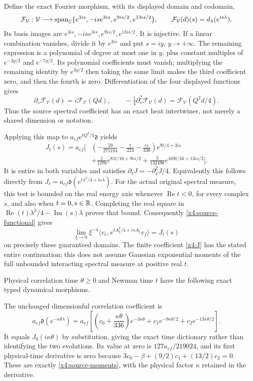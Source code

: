 Define the exact Fourier morphism, with its displayed domain and codomain,
\[
\mathcal F_{\mathcal V}:\mathcal V\longrightarrow
\operatorname{span}_{\mathbb C}\{e^{3is},-is e^{3is},e^{9is/2},e^{13is/2}\},
\qquad
\mathcal F_{\mathcal V}(d)(s)=d_\lambda(e^{is\lambda}).
\]
Its basis images are $e^{3is},-is e^{3is},e^{9is/2},e^{13is/2}$.
It is injective. If a linear combination vanishes, divide it by
$e^{3is}$ and put $s=iy$, $y\to+\infty$. The remaining expression
is a polynomial of degree at most one in $y$, plus constant multiples
of $e^{-3y/2}$ and $e^{-7y/2}$. Its polynomial coefficients must
vanish; multiplying the remaining identity by $e^{3y/2}$ then taking
the same limit makes the third coefficient zero, and then the fourth
is zero. Differentiation of the four displayed functions gives
\[
\partial_s\mathcal F_{\mathcal V}(d)
 =i\mathcal F_{\mathcal V}(Qd),\qquad
-\tfrac14\partial_s^2\mathcal F_{\mathcal V}(d)
 =\mathcal F_{\mathcal V}(Q^2d/4).
\]
Thus the source spectral coefficient has an exact heat intertwiner,
not merely a shared dimension or notation.

Applying this map to $a_{ef}e^{tQ^2/4}\mathfrak d$ yields
\begin{equation}
\begin{split}
J_t(s)=a_{ef}\biggl[&
 \left(-\frac{59}{275184}-\frac{t}{224}-\frac{is}{336}\right)
                                  e^{9t/4+3is}\\
&+\frac1{1296}e^{81t/16+9is/2}
 +\frac3{132496}e^{169t/16+13is/2}\biggr].
\end{split}
\label{x4:J}
\end{equation}
It is entire in both variables and satisfies
$\partial_tJ=-\partial_s^2J/4$. Equivalently this follows directly
from $J_t=a_{ef}\mathfrak d(e^{t\lambda^2/4+is\lambda})$.
For the actual original spectral measure, this test is bounded on
the real energy axis whenever $\operatorname{Re}t<0$, for every
complex $s$, and also when $t=0,s\in\mathbb R$. Completing the real square
in $\operatorname{Re}(t)\lambda^2/4-\operatorname{Im}(s)\lambda$
proves that bound. Consequently \eqref{x4:source-functional} gives
\[
\lim_{\xi\to0}\xi^{-4}
\langle v_e,e^{tA_\xi^2/4+isA_\xi}v_f\rangle=J_t(s)
\]
on precisely these guaranteed domains. The finite coefficient
\eqref{x4:J} has the stated entire continuation; this does not
assume Gaussian exponential moments of the full unbounded interacting
spectral measure at positive real $t$.

Physical correlation time $\theta\ge0$ and Newman time $t$ have the
following exact typed dynamical morphisms.

The unchanged dimensionful correlation coefficient is
\[
a_{ef}\mathfrak d(e^{-\kappa\theta\lambda})
=a_{ef}\left[
 \left(c_0+\frac{\kappa\theta}{336}\right)e^{-3\kappa\theta}
 +c_1e^{-9\kappa\theta/2}+c_2e^{-13\kappa\theta/2}\right].
\]
It equals $J_0(i\kappa\theta)$ by substitution, giving the exact
time dictionary rather than identifying the two evolutions. Its value
at zero is $127a_{ef}/219024$, and its first physical-time derivative
is zero because
$3c_0-\beta+(9/2)c_1+(13/2)c_2=0$.
These are exactly \eqref{x4:source-moments}, with the physical factor
$\kappa$ retained in the derivative.
